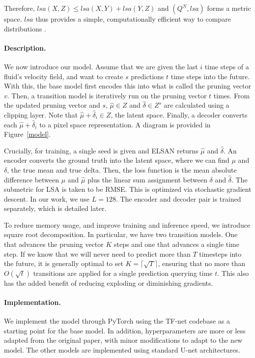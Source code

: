 \documentclass{article}
\begin{document}
Therefore, $lsa(X, Z) \le lsa(X, Y) + lsa(Y, Z)$ and $(Q^N, lsa)$ forms a metric space. $lsa$ thus provides a simple, computationally efficient way to compare distributions \cite{linearsumassignment}.
\paragraph{Description.}
We now introduce our model. Assume that we are given the last $i$ time steps of a fluid's velocity field, and want to create $s$ predictions $t$ time steps into the future. With this, the base model first encodes this into what is called the pruning vector $v$. Then, a transition model is iteratively run on the pruning vector $t$ times. From the updated pruning vector and $s$, $\hat{\mu} \in Z$ and $\hat{\delta} \in Z^{s}$ are calculated using a clipping layer. Note that $\hat{\mu} + \hat{\delta}_i \in Z$, the latent space. Finally, a decoder converts each $\hat{\mu} + \hat{\delta}_i$ to a pixel space representation. A diagram is provided in Figure~\ref{model}.

Crucially, for training, a single seed is given and ELSAN returns $\hat{\mu}$ and $\hat{\delta}$. An encoder converts the ground truth into the latent space, where we can find $\mu$ and $\delta$, the true mean and true delta. Then, the loss function is the mean absolute difference between $\mu$ and $\hat{\mu}$ plus the linear sum assignment between $\delta$ and $\hat{\delta}$. The submetric for LSA is taken to be RMSE. This is optimized via stochastic gradient descent. In our work, we use $L = 128$. The encoder and decoder pair is trained separately, which is detailed later.

To reduce memory usage, and improve training and inference speed, we introduce square root decomposition. In particular, we have two transition models. One that advances the pruning vector $K$ steps and one that advances a single time step. If we know that we will never need to predict more than $T$ timesteps into the future, it is generally optimal to set $K = \lceil\sqrt {T}\rceil$, ensuring that no more than $O\left(\sqrt{t}\right)$ transitions are applied for a single prediction querying time $t$. This also has the added benefit of reducing exploding or diminishing gradients.
\paragraph{Implementation.}
We implement the model through PyTorch using the TF-net \cite{Wang2020TF} codebase as a starting point for the base model. In addition, hyperparameters are more or less adapted from the original paper, with minor modifications to adapt to the new model. The other models are implemented using standard U-net architectures.
\end{document}
